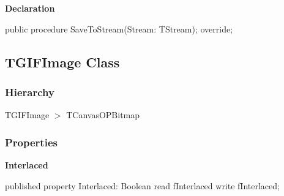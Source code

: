 \documentclass{report}
\newif\ifpdf
\begin{document}
\label{opbitmapformats.TBMPImage-SaveToStream}
\begin{list}{}{
\setlength{\itemindent}{0cm}
\setlength{\listparindent}{0cm}
\setlength{\leftmargin}{\evensidemargin}
\addtolength{\leftmargin}{\tmplength}
\settowidth{\labelsep}{X}
\addtolength{\leftmargin}{\labelsep}
\setlength{\labelwidth}{\tmplength}
}
\item[\textbf{Declaration}\hfill]
\ifpdf
\begin{flushleft}
\fi
\begin{ttfamily}
public procedure SaveToStream(Stream: TStream); override;\end{ttfamily}

\ifpdf
\end{flushleft}
\fi

\end{list}
\ifpdf
\subsection*{\large{\textbf{TGIFImage Class}}\normalsize\hspace{1ex}\hrulefill}
\else
\subsection*{TGIFImage Class}
\fi
\label{opbitmapformats.TGIFImage}
\subsubsection*{\large{\textbf{Hierarchy}}\normalsize\hspace{1ex}\hfill}
TGIFImage {$>$} TCanvasOPBitmap
\subsubsection*{\large{\textbf{Properties}}\normalsize\hspace{1ex}\hfill}
\begin{list}{}{
\setlength{\itemindent}{0cm}
\setlength{\listparindent}{0cm}
\setlength{\leftmargin}{\evensidemargin}
\addtolength{\leftmargin}{\tmplength}
\settowidth{\labelsep}{X}
\addtolength{\leftmargin}{\labelsep}
\setlength{\labelwidth}{\tmplength}
}
\label{opbitmapformats.TGIFImage-Interlaced}
\item[\textbf{Interlaced}\hfill]
\ifpdf
\begin{flushleft}
\fi
\begin{ttfamily}
published property Interlaced: Boolean read fInterlaced write fInterlaced;\end{ttfamily}

\ifpdf
\end{flushleft}
\fi


\par  \end{list}
\end{document}

